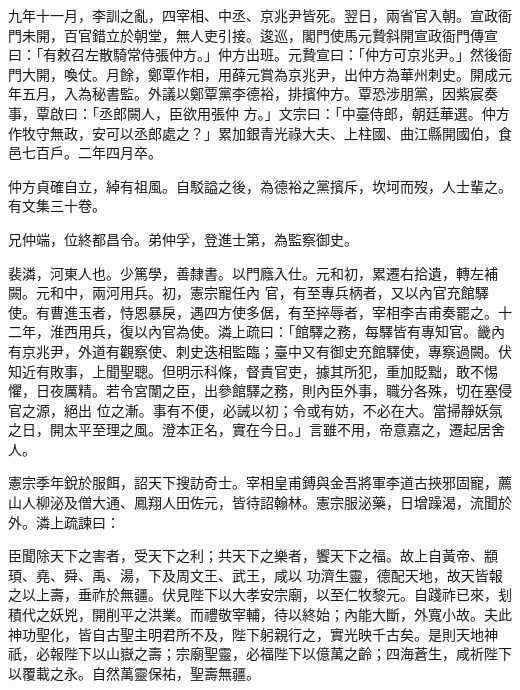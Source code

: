 \begin{pinyinscope}
 九年十一月，李訓之亂，四宰相、中丞、京兆尹皆死。翌日，兩省官入朝。宣政衙門未開，百官錯立於朝堂，無人吏引接。逡巡，閣門使馬元贄斜開宣政衙門傳宣曰：「有敕召左散騎常侍張仲方。」仲方出班。元贄宣曰：「仲方可京兆尹。」然後衙門大開，喚仗。月餘，鄭覃作相，用薛元賞為京兆尹，出仲方為華州刺史。開成元年五月，入為秘書監。外議以鄭覃黨李德裕，排擯仲方。覃恐涉朋黨，因紫宸奏事，覃啟曰：「丞郎闕人，臣欲用張仲
 方。」文宗曰：「中臺侍郎，朝廷華選。仲方作牧守無政，安可以丞郎處之？」累加銀青光祿大夫、上柱國、曲江縣開國伯，食邑七百戶。二年四月卒。



 仲方貞確自立，綽有祖風。自駁謚之後，為德裕之黨擯斥，坎坷而歿，人士輩之。有文集三十卷。



 兄仲端，位終都昌令。弟仲孚，登進士第，為監察御史。



 裴潾，河東人也。少篤學，善隸書。以門廕入仕。元和初，累遷右拾遺，轉左補闕。元和中，兩河用兵。初，憲宗寵任內
 官，有至專兵柄者，又以內官充館驛使。有曹進玉者，恃恩暴戾，遇四方使多倨，有至捽辱者，宰相李吉甫奏罷之。十二年，淮西用兵，復以內官為使。潾上疏曰：「館驛之務，每驛皆有專知官。畿內有京兆尹，外道有觀察使、刺史迭相監臨；臺中又有御史充館驛使，專察過闕。伏知近有敗事，上聞聖聰。但明示科條，督責官吏，據其所犯，重加貶黜，敢不惕懼，日夜厲精。若令宮闈之臣，出參館驛之務，則內臣外事，職分各殊，切在塞侵官之源，絕出
 位之漸。事有不便，必誡以初；令或有妨，不必在大。當掃靜妖氛之日，開太平至理之風。澄本正名，實在今日。」言雖不用，帝意嘉之，遷起居舍人。



 憲宗季年銳於服餌，詔天下搜訪奇士。宰相皇甫鎛與金吾將軍李道古挾邪固寵，薦山人柳泌及僧大通、鳳翔人田佐元，皆待詔翰林。憲宗服泌藥，日增躁渴，流聞於外。潾上疏諫曰：



 臣聞除天下之害者，受天下之利；共天下之樂者，饗天下之福。故上自黃帝、顓頊、堯、舜、禹、湯，下及周文王、武王，咸以
 功濟生靈，德配天地，故天皆報之以上壽，垂祚於無疆。伏見陛下以大孝安宗廟，以至仁牧黎元。自踐祚已來，刬積代之妖兇，開削平之洪業。而禮敬宰輔，待以終始；內能大斷，外寬小故。夫此神功聖化，皆自古聖主明君所不及，陛下躬親行之，實光映千古矣。是則天地神祇，必報陛下以山嶽之壽；宗廟聖靈，必福陛下以億萬之齡；四海蒼生，咸祈陛下以覆載之永。自然萬靈保祐，聖壽無疆。




\end{pinyinscope}
